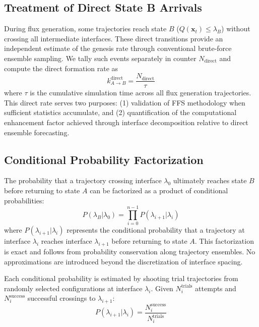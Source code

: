\documentclass[11pt]{article}
\begin{document}
\subsection{Treatment of Direct State B Arrivals}

During flux generation, some trajectories reach state $B$ ($Q(\mathbf{x}_t) \leq \lambda_B$) without crossing all intermediate interfaces. These direct transitions provide an independent estimate of the genesis rate through conventional brute-force ensemble sampling. We tally such events separately in counter $N_{\text{direct}}$ and compute the direct formation rate as
\begin{equation}
k_{A \to B}^{\text{direct}} = \frac{N_{\text{direct}}}{\tau}
\end{equation}
where $\tau$ is the cumulative simulation time across all flux generation trajectories. This direct rate serves two purposes: (1) validation of FFS methodology when sufficient statistics accumulate, and (2) quantification of the computational enhancement factor achieved through interface decomposition relative to direct ensemble forecasting.

\subsection{Conditional Probability Factorization}

The probability that a trajectory crossing interface $\lambda_0$ ultimately reaches state $B$ before returning to state $A$ can be factorized as a product of conditional probabilities:
\begin{equation}\label{eq:ffs_factorization}
P(\lambda_B | \lambda_0) = \prod_{i=0}^{n-1} P(\lambda_{i+1} | \lambda_i)
\end{equation}
where $P(\lambda_{i+1}|\lambda_i)$ represents the conditional probability that a trajectory at interface $\lambda_i$ reaches interface $\lambda_{i+1}$ before returning to state $A$. This factorization is exact and follows from probability conservation along trajectory ensembles. No approximations are introduced beyond the discretization of interface spacing.

Each conditional probability is estimated by shooting trial trajectories from randomly selected configurations at interface $\lambda_i$. Given $N_i^{\text{trials}}$ attempts and $N_i^{\text{success}}$ successful crossings to $\lambda_{i+1}$:
\begin{equation}
P(\lambda_{i+1} | \lambda_i) = \frac{N_i^{\text{success}}}{N_i^{\text{trials}}}
\end{equation}
\end{document}
